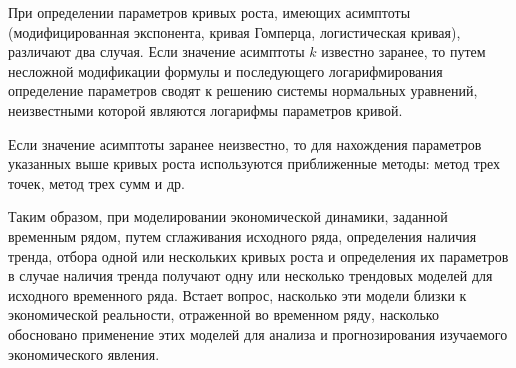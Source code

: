 При определении параметров кривых роста, имеющих асимптоты (модифицированная экспонента, кривая Гомперца, логистическая кривая), различают два случая. Если значение асимптоты $ k $ известно заранее, то путем несложной модификации формулы и последующего логарифмирования определение параметров сводят к решению системы нормальных уравнений, неизвестными которой являются логарифмы параметров кривой.

Если значение асимптоты заранее неизвестно, то для нахождения параметров указанных выше кривых роста используются приближенные методы: метод трех точек, метод трех сумм и др.

Таким образом, при моделировании экономической динамики, заданной временным рядом, путем сглаживания исходного ряда, определения наличия тренда, отбора одной или нескольких кривых роста и определения их параметров в случае наличия тренда получают одну или несколько трендовых моделей для исходного временного ряда. Встает вопрос, насколько эти модели близки к экономической реальности, отраженной во временном ряду, насколько обосновано применение этих моделей для анализа и прогнозирования изучаемого экономического явления.


























